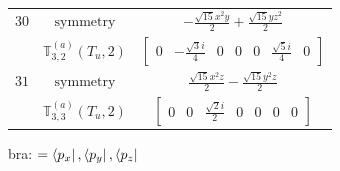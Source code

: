 \documentclass[fleqn,8pt,landscape]{jsarticle}
\begin{document}
\begin{longtable}{ccc}
$ 30 $ & $ \text{symmetry} $ & $ - \frac{\sqrt{15} x^{2} y}{2} + \frac{\sqrt{15} y z^{2}}{2} $ \\
$  $ & $ \mathbb{T}_{3,2}^{(a)}(T_{u},2) $ & $ \begin{bmatrix} 0 & - \frac{\sqrt{3} i}{4} & 0 & 0 & 0 & \frac{\sqrt{5} i}{4} & 0 \end{bmatrix} $ \\ \hline
$ 31 $ & $ \text{symmetry} $ & $ \frac{\sqrt{15} x^{2} z}{2} - \frac{\sqrt{15} y^{2} z}{2} $ \\
$  $ & $ \mathbb{T}_{3,3}^{(a)}(T_{u},2) $ & $ \begin{bmatrix} 0 & 0 & \frac{\sqrt{2} i}{2} & 0 & 0 & 0 & 0 \end{bmatrix} $ \\ \hline
\end{longtable}
bra: $=\bra{p_{x}}, \bra{p_{y}}, \bra{p_{z}}$
\end{document}
